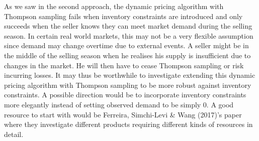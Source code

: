 \documentclass[a4paper]{article}
\begin{document}
\newline
\newline
As we saw in the second approach, the dynamic pricing algorithm with Thompson sampling fails when inventory constraints are introduced and only succeeds when the seller knows they can meet market demand during the selling season. In certain real world markets, this may not be a very flexible assumption since demand may change overtime due to external events. A seller might be in the middle of the selling season when he realises his supply is insufficient due to changes in the market. He will then have to cease Thompson sampling or risk incurring losses. It may thus be worthwhile to investigate extending this dynamic pricing algorithm with Thompson sampling to be more robust against inventory constraints. A possible direction would be to incorporate inventory constraints more elegantly instead of setting observed demand to be simply 0. A good resource to start with would be Ferreira, Simchi-Levi \& Wang (2017)'s paper where they investigate different products requiring different kinds of resources in detail.
\newpage
\end{document}
